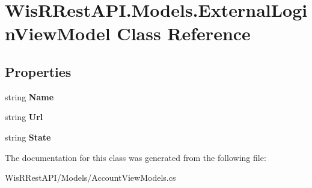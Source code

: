 \hypertarget{class_wis_r_rest_a_p_i_1_1_models_1_1_external_login_view_model}{}\section{Wis\+R\+Rest\+A\+P\+I.\+Models.\+External\+Login\+View\+Model Class Reference}
\label{class_wis_r_rest_a_p_i_1_1_models_1_1_external_login_view_model}
\subsection*{Properties}
\begin{DoxyCompactItemize}
\item 
\hypertarget{class_wis_r_rest_a_p_i_1_1_models_1_1_external_login_view_model_aa86dfcb00e2334caeab119308a833476}{}string {\bfseries Name}\label{class_wis_r_rest_a_p_i_1_1_models_1_1_external_login_view_model_aa86dfcb00e2334caeab119308a833476}

\item 
\hypertarget{class_wis_r_rest_a_p_i_1_1_models_1_1_external_login_view_model_a1004d699c7ba693c6e19094591bbe3be}{}string {\bfseries Url}\label{class_wis_r_rest_a_p_i_1_1_models_1_1_external_login_view_model_a1004d699c7ba693c6e19094591bbe3be}

\item 
\hypertarget{class_wis_r_rest_a_p_i_1_1_models_1_1_external_login_view_model_a79161c1b57d1b484a09ab5cc342a4fe7}{}string {\bfseries State}\label{class_wis_r_rest_a_p_i_1_1_models_1_1_external_login_view_model_a79161c1b57d1b484a09ab5cc342a4fe7}

\end{DoxyCompactItemize}


The documentation for this class was generated from the following file\+:\begin{DoxyCompactItemize}
\item 
Wis\+R\+Rest\+A\+P\+I/\+Models/Account\+View\+Models.\+cs\end{DoxyCompactItemize}
